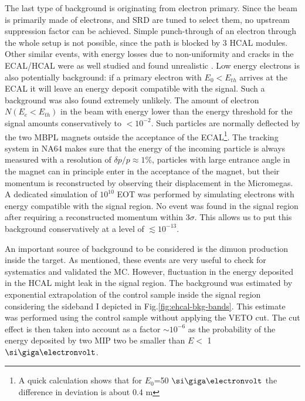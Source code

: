 The last type of background is originating from electron primary. Since the beam is primarily made of electrons, and SRD are tuned to select them, no upstream suppression factor can be achieved. Simple punch-through of an electron through the whole setup is not possible, since the path is blocked by 3 HCAL modules. Other similar events, with energy losses due to non-uniformity and cracks in the ECAL/HCAL were as well studied and found unrealistic \cite{Andreas:2013lya}. Low energy electrons is also potentially background: if a primary electron with $E_0 < E_{th}$ arrives at the ECAL it will leave an energy deposit compatible with the signal. Such a background was also found extremely unlikely. The amount of electron $N(E_e<E_{th})$ in the beam with energy lower than the energy threshold for the signal amounts conservatively to $<10^{-2}$. Such particles are normally deflected by the two MBPL magnets outside the acceptance of the ECAL\footnote{A quick calculation shows that for $E_0$=50 $\gev$ the difference in deviation is about 0.4 \si{\meter}}. The tracking system in NA64 makes sure that the energy of the incoming particle is always measured with a resolution of $\delta p/p \approx 1\%$, particles with large entrance angle in the magnet can in principle enter in the acceptance of the magnet, but their momentum is reconstructed by observing their displacement in the Micromegas. A dedicated simulation of $10^{10}$ EOT was performed by simulating electrons with energy compatible with the signal region. No event was found in the signal region after requiring a reconstructed momentum within 3$\sigma$. This allows us to put this background conservatively at a level of $\lesssim 10^{-13}$.

An important source of background to be considered is the dimuon production inside the target. As mentioned, these events are very useful to check for systematics and validated the MC. However, fluctuation in the energy deposited in the HCAL might leak in the signal region. The background was estimated by exponential extrapolation of the control sample inside the signal region considering the sideband I depicted in Fig.\ref{fig:ehcal-bkg-bands}. This estimate was performed using the control sample without applying the VETO cut. The cut effect is then taken into account as a factor $\sim 10^{-6}$ as the probability of the energy deposited by two MIP two be smaller than $E<$ 1 $\gev$.

